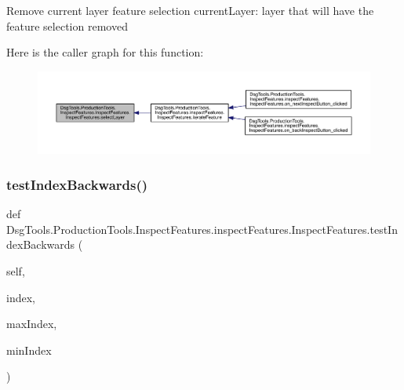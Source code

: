 \begin{DoxyVerb}Remove current layer feature selection
currentLayer: layer that will have the feature selection removed
\end{DoxyVerb}
 Here is the caller graph for this function\+:
\nopagebreak
\begin{figure}[H]
\begin{center}
\leavevmode
\includegraphics[width=350pt]{class_dsg_tools_1_1_production_tools_1_1_inspect_features_1_1inspect_features_1_1_inspect_features_ac4a9bc09918ae38f532a5c99495040af_icgraph}
\end{center}
\end{figure}
\mbox{\label{class_dsg_tools_1_1_production_tools_1_1_inspect_features_1_1inspect_features_1_1_inspect_features_a6474dcbfbd375697fbdfe59326040d29}} 
\subsubsection{\texorpdfstring{test\+Index\+Backwards()}{testIndexBackwards()}}
{\footnotesize\ttfamily def Dsg\+Tools.\+Production\+Tools.\+Inspect\+Features.\+inspect\+Features.\+Inspect\+Features.\+test\+Index\+Backwards (\begin{DoxyParamCaption}\item[{}]{self,  }\item[{}]{index,  }\item[{}]{max\+Index,  }\item[{}]{min\+Index }\end{DoxyParamCaption})}

